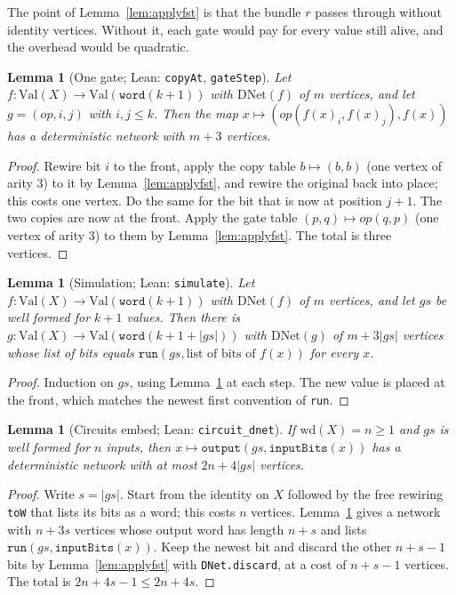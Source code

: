 \documentclass[11pt]{amsart}
\newtheorem{lemma}[theorem]{Lemma}
\theoremstyle{definition}
\theoremstyle{remark}
\newcommand{\lean}[1]{\texttt{#1}}
\newcommand{\DNet}{\mathrm{DNet}}
\newcommand{\Val}{\mathrm{Val}}
\newcommand{\wdt}{\mathrm{wd}}
\begin{document}
The point of Lemma~\ref{lem:applyfst} is that the bundle $r$ passes through without identity vertices. Without it, each gate would pay for every value still alive, and the overhead would be quadratic.

\begin{lemma}[One gate; Lean: \lean{copyAt}, \lean{gateStep}]\label{lem:gate}
Let $f\colon\Val(X)\to\Val(\mathtt{word}(k+1))$ with $\DNet(f)$ of $m$ vertices, and let $g=(\mathit{op},i,j)$ with $i,j\le k$. Then the map $x\mapsto(\mathit{op}(f(x)_i,f(x)_j),f(x))$ has a deterministic network with $m+3$ vertices.
\end{lemma}
\begin{proof}
Rewire bit $i$ to the front, apply the copy table $b\mapsto(b,b)$ (one vertex of arity $3$) to it by Lemma~\ref{lem:applyfst}, and rewire the original back into place; this costs one vertex. Do the same for the bit that is now at position $j+1$. The two copies are now at the front. Apply the gate table $(p,q)\mapsto\mathit{op}(q,p)$ (one vertex of arity $3$) to them by Lemma~\ref{lem:applyfst}. The total is three vertices.
\end{proof}

\begin{lemma}[Simulation; Lean: \lean{simulate}]\label{lem:sim}
Let $f\colon\Val(X)\to\Val(\mathtt{word}(k+1))$ with $\DNet(f)$ of $m$ vertices, and let $gs$ be well formed for $k+1$ values. Then there is $g\colon\Val(X)\to\Val(\mathtt{word}(k+1+|gs|))$ with $\DNet(g)$ of $m+3|gs|$ vertices whose list of bits equals $\mathtt{run}(gs,\text{list of bits of }f(x))$ for every $x$.
\end{lemma}
\begin{proof}
Induction on $gs$, using Lemma~\ref{lem:gate} at each step. The new value is placed at the front, which matches the newest first convention of \lean{run}.
\end{proof}

\begin{lemma}[Circuits embed; Lean: \lean{circuit\_dnet}]\label{lem:embed}
If $\wdt(X)=n\ge 1$ and $gs$ is well formed for $n$ inputs, then $x\mapsto\mathtt{output}(gs,\mathtt{inputBits}(x))$ has a deterministic network with at most $2n+4|gs|$ vertices.
\end{lemma}
\begin{proof}
Write $s=|gs|$. Start from the identity on $X$ followed by the free rewiring \lean{toW} that lists its bits as a word; this costs $n$ vertices. Lemma~\ref{lem:sim} gives a network with $n+3s$ vertices whose output word has length $n+s$ and lists $\mathtt{run}(gs,\mathtt{inputBits}(x))$. Keep the newest bit and discard the other $n+s-1$ bits by Lemma~\ref{lem:applyfst} with \lean{DNet.discard}, at a cost of $n+s-1$ vertices. The total is $2n+4s-1\le 2n+4s$.
\end{proof}
\end{document}
